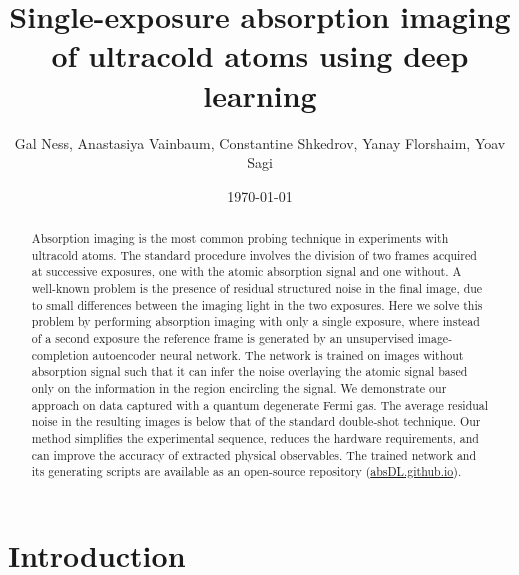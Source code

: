 \documentclass[twocolumn,groupedaddress,longbibliography]{revtex4-1}
\begin{document}
\title{Single-exposure absorption imaging of ultracold atoms using deep learning}

\author{Gal Ness, Anastasiya Vainbaum, Constantine Shkedrov, Yanay Florshaim, Yoav Sagi}


\date{\today}
\begin{abstract}
Absorption imaging is the most common probing technique in experiments with ultracold atoms. The standard procedure involves the division of two frames acquired at successive exposures, one with the atomic absorption signal and one without. A well-known problem is the presence of residual structured noise in the final image, due to small differences between the imaging light in the two exposures. Here we solve this problem by performing absorption imaging with only a single exposure, where instead of a second exposure the reference frame is generated by an unsupervised image-completion autoencoder neural network. The network is trained on images without absorption signal such that it can infer the noise overlaying the atomic signal based only on the information in the region encircling the signal. We demonstrate our approach on data captured with a quantum degenerate Fermi gas. The average residual noise in the resulting images is below that of the standard double-shot technique. Our method simplifies the experimental sequence, reduces the hardware requirements, and can improve the accuracy of extracted physical observables. The trained network and its generating scripts are available as an open-source repository (\href{http://absDL.github.io/}{absDL.github.io}).
\end{abstract}

\maketitle


\section{Introduction}
\end{document}
